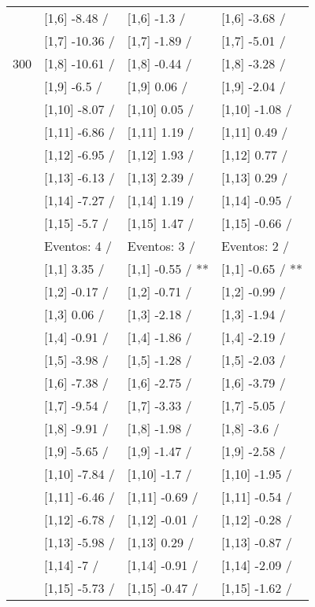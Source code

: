 \begin{table}
\begin{tabular}[t]{llll}
 & {}[1,6] -8.48  / & {}[1,6] -1.3  / & {}[1,6] -3.68  /\\
 & {}[1,7] -10.36  / & {}[1,7] -1.89  / & {}[1,7] -5.01  /\\
300 & {}[1,8] -10.61  / & {}[1,8] -0.44  / & {}[1,8] -3.28  /\\
\addlinespace
 & {}[1,9] -6.5  / & {}[1,9] 0.06  / & {}[1,9] -2.04  /\\
 & {}[1,10] -8.07  / & {}[1,10] 0.05  / & {}[1,10] -1.08  /\\
 & {}[1,11] -6.86  / & {}[1,11] 1.19  / & {}[1,11] 0.49  /\\
 & {}[1,12] -6.95  / & {}[1,12] 1.93  / & {}[1,12] 0.77  /\\
 & {}[1,13] -6.13  / & {}[1,13] 2.39  / & {}[1,13] 0.29  /\\
\addlinespace
 & {}[1,14] -7.27  / & {}[1,14] 1.19  / & {}[1,14] -0.95  /\\
 & {}[1,15] -5.7  / & {}[1,15] 1.47  / & {}[1,15] -0.66  /\\
 & Eventos:  4 / & Eventos:  3 / & Eventos:  2 /\\
 & {}[1,1] 3.35  / & {}[1,1] -0.55  / ** & {}[1,1] -0.65  / **\\
 & {}[1,2] -0.17  / & {}[1,2] -0.71  / & {}[1,2] -0.99  /\\
\addlinespace
 & {}[1,3] 0.06  / & {}[1,3] -2.18  / & {}[1,3] -1.94  /\\
 & {}[1,4] -0.91  / & {}[1,4] -1.86  / & {}[1,4] -2.19  /\\
 & {}[1,5] -3.98  / & {}[1,5] -1.28  / & {}[1,5] -2.03  /\\
 & {}[1,6] -7.38  / & {}[1,6] -2.75  / & {}[1,6] -3.79  /\\
 & {}[1,7] -9.54  / & {}[1,7] -3.33  / & {}[1,7] -5.05  /\\
\addlinespace
500 & {}[1,8] -9.91  / & {}[1,8] -1.98  / & {}[1,8] -3.6  /\\
 & {}[1,9] -5.65  / & {}[1,9] -1.47  / & {}[1,9] -2.58  /\\
 & {}[1,10] -7.84  / & {}[1,10] -1.7  / & {}[1,10] -1.95  /\\
 & {}[1,11] -6.46  / & {}[1,11] -0.69  / & {}[1,11] -0.54  /\\
 & {}[1,12] -6.78  / & {}[1,12] -0.01  / & {}[1,12] -0.28  /\\
\addlinespace
 & {}[1,13] -5.98  / & {}[1,13] 0.29  / & {}[1,13] -0.87  /\\
 & {}[1,14] -7  / & {}[1,14] -0.91  / & {}[1,14] -2.09  /\\
 & {}[1,15] -5.73  / & {}[1,15] -0.47  / & {}[1,15] -1.62  /\\
\bottomrule
\end{tabular}
\end{table}
